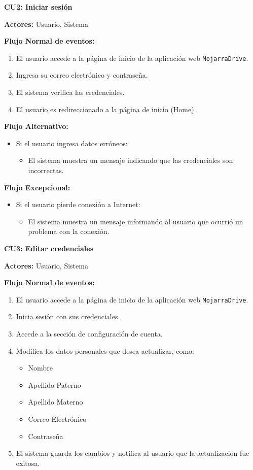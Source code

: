 \textbf{\large CU2: Iniciar sesión} \

\textbf{Actores:} Usuario, Sistema \

\textbf{Flujo Normal de eventos:}
\begin{enumerate}
\item El usuario accede a la página de inicio de la aplicación web \texttt{MojarraDrive}.
\item Ingresa su correo electrónico y contraseña.
\item El sistema verifica las credenciales.
\item El usuario es redireccionado a la página de inicio (Home).
\end{enumerate}

\textbf{Flujo Alternativo:}
\begin{itemize}
\item Si el usuario ingresa datos erróneos:
\begin{itemize}
\item El sistema muestra un mensaje indicando que las credenciales son incorrectas.
\end{itemize}
\end{itemize}

\textbf{Flujo Excepcional:}
\begin{itemize}
\item Si el usuario pierde conexión a Internet:
\begin{itemize}
\item El sistema muestra un mensaje informando al usuario que ocurrió un problema con la conexión.
\end{itemize}
\end{itemize}

\textbf{\large CU3: Editar credenciales} \

\textbf{Actores:} Usuario, Sistema \

\textbf{Flujo Normal de eventos:}
\begin{enumerate}
\item El usuario accede a la página de inicio de la aplicación web \texttt{MojarraDrive}.
\item Inicia sesión con sus credenciales.
\item Accede a la sección de configuración de cuenta.
\item Modifica los datos personales que desea actualizar, como:
\begin{itemize}
\item Nombre
\item Apellido Paterno
\item Apellido Materno
\item Correo Electrónico
\item Contraseña
\end{itemize}
\item El sistema guarda los cambios y notifica al usuario que la actualización fue exitosa.
\end{enumerate}

